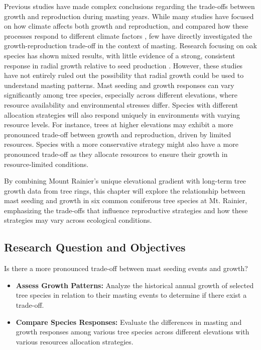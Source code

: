 \documentclass[11pt,letter]{article}
\begin{document}
Previous studies have made complex conclusions regarding the trade-offs between growth and reproduction during masting years. While many studies have focused on how climate affects both growth and reproduction, and compared how these processes respond to different climate factors \citep{koenig2020can, bajocco2021characterizing, redmond2019resource, sanchez2011trade}, few have directly investigated the growth-reproduction trade-off in the context of masting. Research focusing on oak species has shown mixed results, with little evidence of a strong, consistent response in radial growth relative to seed production \citep{koenig2020can, patterson2023acorn}. However, these studies have not entirely ruled out the possibility that radial growth could be used to understand masting patterns. Mast seeding and growth responses can vary significantly among tree species, especially across different elevations, where resource availability and environmental stresses differ. Species with different allocation strategies will also respond uniquely in environments with varying resource levels. For instance, trees at higher elevations may exhibit a more pronounced trade-off between growth and reproduction, driven by limited resources. Species with a more conservative strategy might also have a more pronounced trade-off as they allocate resources to ensure their growth in resource-limited conditions.\par
By combining Mount Rainier's unique elevational gradient with long-term tree growth data from tree rings, this chapter will explore the relationship between mast seeding and growth in six common coniferous tree species at Mt. Rainier, emphasizing the trade-offs that influence reproductive strategies and how these strategies may vary across ecological conditions.\par

\subsection{Research Question and Objectives}
Is there a more pronounced trade-off between mast seeding events and growth?
	\begin{itemize}
	\item \textbf{Assess Growth Patterns:} Analyze the historical annual growth of selected tree species in relation to their masting events to determine if there exist a trade-off.
	\item \textbf{Compare Species Responses:} Evaluate the differences in masting and growth responses among various tree species across different elevations with various resources allocation strategies.
	\end{itemize}
\end{document}
